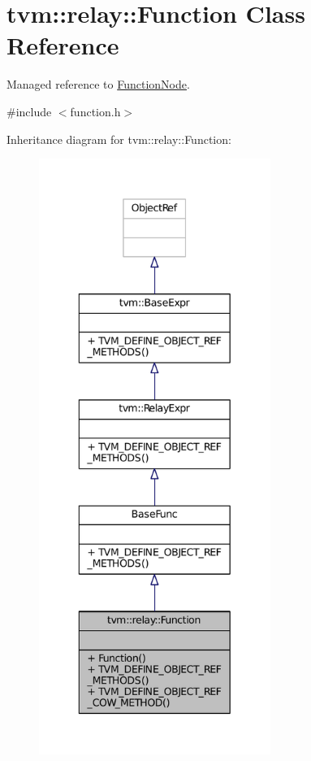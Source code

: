 \hypertarget{classtvm_1_1relay_1_1Function}{}\section{tvm\+:\+:relay\+:\+:Function Class Reference}
\label{classtvm_1_1relay_1_1Function}


Managed reference to \hyperlink{classtvm_1_1relay_1_1FunctionNode}{Function\+Node}.  




{\ttfamily \#include $<$function.\+h$>$}



Inheritance diagram for tvm\+:\+:relay\+:\+:Function\+:
\nopagebreak
\begin{figure}[H]
\begin{center}
\leavevmode
\includegraphics[height=550pt]{classtvm_1_1relay_1_1Function__inherit__graph}
\end{center}
\end{figure}


